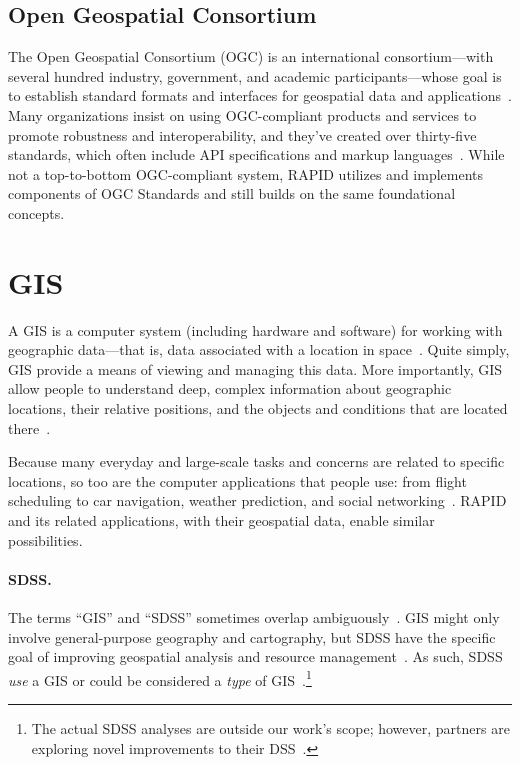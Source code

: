 \subsection{Open Geospatial Consortium}
The Open Geospatial Consortium (OGC) is an international consortium---with several hundred industry, government, and academic participants---whose goal is to establish standard formats and interfaces for geospatial data and applications~\cite{ogc}. Many organizations insist on using OGC-compliant products and services to promote robustness and interoperability, and they've created over thirty-five standards, which often include API specifications and markup languages~\cite{ogc,Dunning2013}. While not a top-to-bottom OGC-compliant system, RAPID utilizes and implements components of OGC Standards and still builds on the same foundational concepts.

\section{GIS}
A GIS is a computer system (including hardware and software) for working with geographic data---that is, data associated with a location in space~\cite{Esriintro,gentle_intro}. Quite simply, GIS provide a means of viewing and managing this data. More importantly, GIS allow people to understand deep, complex information about geographic locations, their relative positions, and the objects and conditions that are located there~\cite{Esriintro,gentle_intro}.

Because many everyday and large-scale tasks and concerns are related to specific locations, so too are the computer applications that people use: from flight scheduling to car navigation, weather prediction, and social networking~\cite{Esriintro}. RAPID and its related applications, with their geospatial data, enable similar possibilities.

\paragraph{SDSS.}
The terms ``GIS'' and ``SDSS'' sometimes overlap ambiguously~\cite{Peterson}. GIS might only involve general-purpose geography and cartography, but SDSS have the specific goal of improving geospatial analysis and resource management~\cite{Peterson}. As such, SDSS \textit{use} a GIS or could be considered a \textit{type} of GIS~\cite{Peterson}.\footnote{The actual SDSS analyses are outside our work's scope; however, partners are exploring novel improvements to their DSS~\cite{Dunning2013}.}

